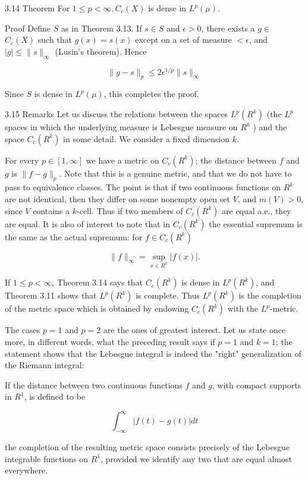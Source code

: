 \documentclass[10pt]{article}
\begin{document}
3.14 Theorem For $1 \leq p<\infty, C_{c}(X)$ is dense in $L^{p}(\mu)$.

Proof Define $S$ as in Theorem 3.13. If $s \in S$ and $\epsilon>0$, there exists a $g \in$ $C_{c}(X)$ such that $g(x)=s(x)$ except on a set of measure $<\epsilon$, and $|g| \leq\|s\|_{\infty}$ (Lusin's theorem). Hence

$$
\|g-s\|_{p} \leq 2 \epsilon^{1 / p}\|s\|_{\infty}
$$

Since $S$ is dense in $L^{p}(\mu)$, this completes the proof.

3.15 Remarks Let us discuss the relations between the spaces $L^{p}\left(R^{k}\right)$ (the $L^{p}$ spaces in which the underlying measure is Lebesgue measure on $R^{k}$ ) and the space $C_{c}\left(R^{k}\right)$ in some detail. We consider a fixed dimension $k$.

For every $p \in[1, \infty]$ we have a metric on $C_{c}\left(R^{k}\right)$; the distance between $f$ and $g$ is $\|f-g\|_{p}$. Note that this is a genuine metric, and that we do not have to pass to equivalence classes. The point is that if two continuous functions on $R^{k}$ are not identical, then they differ on some nonempty open set $V$, and $m(V)>0$, since $V$ contains a $k$-cell. Thus if two members of $C_{c}\left(R^{k}\right)$ are equal a.e., they are equal. It is also of interest to note that in $C_{c}\left(R^{k}\right)$ the essential supremum is the same as the actual supremum: for $f \in C_{c}\left(R^{k}\right)$

$$
\|f\|_{\infty}=\sup _{x \in R^{k}}|f(x)| .
$$

If $1 \leq p<\infty$, Theorem 3.14 says that $C_{c}\left(R^{k}\right)$ is dense in $L^{p}\left(R^{k}\right)$, and Theorem 3.11 shows that $L^{p}\left(R^{k}\right)$ is complete. Thus $L^{p}\left(R^{k}\right)$ is the completion of the metric space which is obtained by endowing $C_{c}\left(R^{k}\right)$ with the $L^{p}$-metric.

The cases $p=1$ and $p=2$ are the ones of greatest interest. Let us state once more, in different words, what the preceding result says if $p=1$ and $k=1$; the statement shows that the Lebesgue integral is indeed the "right" generalization of the Riemann integral:

If the distance between two continuous functions $f$ and $g$, with compact supports in $R^{1}$, is defined to be

$$
\int_{-\infty}^{\infty}|f(t)-g(t)| d t
$$

the completion of the resulting metric space consists precisely of the Lebesgue integrable functions on $R^{1}$, provided we identify any two that are equal almost everywhere.
\end{document}
